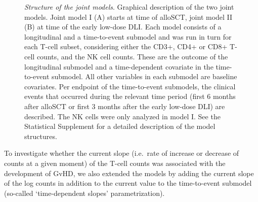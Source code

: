 \documentclass[
  letterpaper,
  DIV=11,
  numbers=noendperiod]{scrreprt}
\begin{document}
\begin{figure}


\caption{\label{fig-DLI-one}\emph{Structure of the joint models}.
Graphical description of the two joint models. Joint model I (A) starts
at time of alloSCT, joint model II (B) at time of the early low-dose
DLI. Each model consists of a longitudinal and a time-to-event submodel
and was run in turn for each T-cell subset, considering either the CD3+,
CD4+ or CD8+ T-cell counts, and the NK cell counts. These are the
outcome of the longitudinal submodel and a time-dependent covariate in
the time-to-event submodel. All other variables in each submodel are
baseline covariates. Per endpoint of the time-to-event submodels, the
clinical events that occurred during the relevant time period (first 6
months after alloSCT or first 3 months after the early low-dose DLI) are
described. The NK cells were only analyzed in model I. See the
Statistical Supplement for a detailed description of the model
structures.}

\end{figure}%

To investigate whether the current slope (i.e.~rate of increase or
decrease of counts at a given moment) of the T-cell counts was
associated with the development of GvHD, we also extended the models by
adding the current slope of the log counts in addition to the current
value to the time-to-event submodel (so-called `time-dependent slopes'
parametrization).
\end{document}
